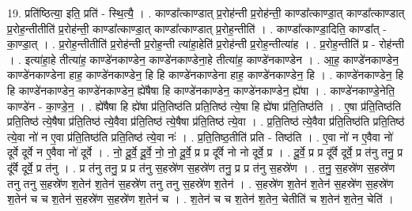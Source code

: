 \documentclass[17pt]{extarticle}
\begin{document}
19. प्रति॑ष्ठित्या॒ इति॒ प्रति॑ - स्थि॒त्यै॒ । . काण्डा᳚त्काण्डात् प्र॒रोह॑न्ती प्र॒रोह॑न्ती॒ काण्डा᳚त्काण्डा॒त् काण्डा᳚त्काण्डात् प्र॒रोह॒न्तीतीति॑ प्र॒रोह॑न्ती॒ काण्डा᳚त्काण्डा॒त् काण्डा᳚त्काण्डात् प्र॒रोह॒न्तीति॑ । . काण्डा᳚त्काण्डा॒दिति॒ काण्डा᳚त् - का॒ण्डा॒त् । . प्र॒रोह॒न्तीतीति॑ प्र॒रोह॑न्ती प्र॒रोह॒न्ती त्या॑हा॒हेति॑ प्र॒रोह॑न्ती प्र॒रोह॒न्तीत्या॑ह । . प्र॒रोह॒न्तीति॑ प्र - रोह॑न्ती । . इत्या॑हा॒हे तीत्या॑ह॒ काण्डे॑नकाण्डेन॒ काण्डे॑नकाण्डेना॒हे तीत्या॑ह॒ काण्डे॑नकाण्डेन । . आ॒ह॒ काण्डे॑नकाण्डेन॒ काण्डे॑नकाण्डेना हाह॒ काण्डे॑नकाण्डेन॒ हि हि काण्डे॑नकाण्डेना हाह॒ काण्डे॑नकाण्डेन॒ हि । . काण्डे॑नकाण्डेन॒ हि हि काण्डे॑नकाण्डेन॒ काण्डे॑नकाण्डेन॒ ह्ये॑षैषा हि काण्डे॑नकाण्डेन॒ काण्डे॑नकाण्डेन॒ ह्ये॑षा । . काण्डे॑नकाण्डे॒नेति॒ काण्डे॑न - का॒ण्डे॒न॒ । . ह्ये॑षैषा हि ह्ये॑षा प्र॑ति॒तिष्ठ॑ति प्रति॒तिष्ठ॑ त्ये॒षा हि ह्ये॑षा प्र॑ति॒तिष्ठ॑ति । . ए॒षा प्र॑ति॒तिष्ठ॑ति प्रति॒तिष्ठ॑ त्ये॒षैषा प्र॑ति॒तिष्ठ॑ त्ये॒वैवा प्र॑ति॒तिष्ठ॑ त्ये॒षैषा प्र॑ति॒तिष्ठ॑ त्ये॒वा । . प्र॒ति॒तिष्ठ॑ त्ये॒वैवा प्र॑ति॒तिष्ठ॑ति प्रति॒तिष्ठ॑ त्ये॒वा नो॑ न ए॒वा प्र॑ति॒तिष्ठ॑ति प्रति॒तिष्ठ॑ त्ये॒वा नः॑ । . प्र॒ति॒तिष्ठ॒तीति॑ प्रति - तिष्ठ॑ति । . ए॒वा नो॑ न ए॒वैवा नो॑ दूर्वे दूर्वे न ए॒वैवा नो॑ दूर्वे । . नो॒ दू॒र्वे॒ दू॒र्वे॒ नो॒ नो॒ दू॒र्वे॒ प्र प्र दू᳚र्वे नो नो दूर्वे॒ प्र । . दू॒र्वे॒ प्र प्र दू᳚र्वे दूर्वे॒ प्र त॑नु तनु॒ प्र दू᳚र्वे दूर्वे॒ प्र त॑नु । . प्र त॑नु तनु॒ प्र प्र त॑नु स॒हस्रे॑ण स॒हस्रे॑ण तनु॒ प्र प्र त॑नु स॒हस्रे॑ण । . त॒नु॒ स॒हस्रे॑ण स॒हस्रे॑ण तनु तनु स॒हस्रे॑ण श॒तेन॑ श॒तेन॑ स॒हस्रे॑ण तनु तनु स॒हस्रे॑ण श॒तेन॑ । . स॒हस्रे॑ण श॒तेन॑ श॒तेन॑ स॒हस्रे॑ण स॒हस्रे॑ण श॒तेन॑ च च श॒तेन॑ स॒हस्रे॑ण स॒हस्रे॑ण श॒तेन॑ च । . श॒तेन॑ च च श॒तेन॑ श॒तेन॒ चेतीति॑ च श॒तेन॑ श॒तेन॒ चेति॑ । \newline
\end{document}
